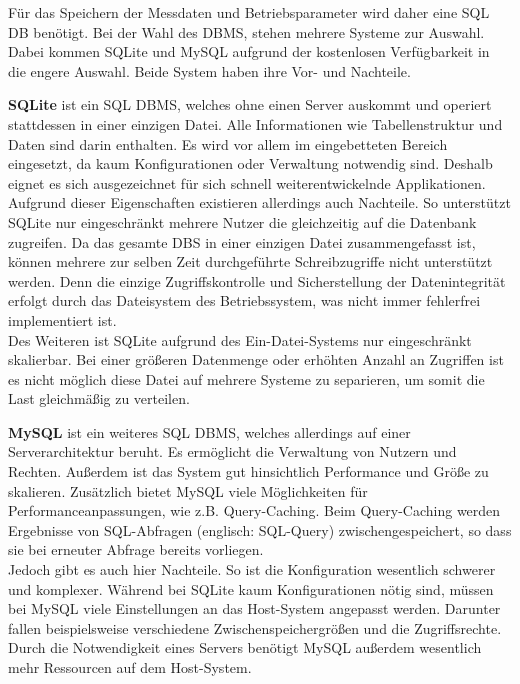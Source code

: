 Für das Speichern der Messdaten und Betriebsparameter wird daher eine \ac{SQL} \ac{DB} benötigt. Bei der Wahl des \ac{DBMS}, stehen mehrere Systeme zur Auswahl. Dabei kommen SQLite und MySQL aufgrund der kostenlosen Verfügbarkeit in die engere Auswahl.
Beide System haben ihre Vor- und Nachteile.


\textbf{SQLite} ist ein \ac{SQL} \ac{DBMS}, welches ohne einen Server auskommt und operiert stattdessen in einer einzigen Datei. Alle Informationen wie Tabellenstruktur und Daten sind darin enthalten. Es wird vor allem im eingebetteten Bereich eingesetzt, da kaum Konfigurationen oder Verwaltung notwendig sind. Deshalb eignet es sich ausgezeichnet für sich schnell weiterentwickelnde Applikationen.
\\
Aufgrund dieser Eigenschaften existieren allerdings auch Nachteile. So unterstützt SQLite nur eingeschränkt mehrere Nutzer die gleichzeitig auf die Datenbank zugreifen. Da das gesamte \ac{DBS} in einer einzigen Datei zusammengefasst ist, können mehrere zur selben Zeit durchgeführte Schreibzugriffe nicht unterstützt werden. Denn die einzige Zugriffskontrolle und Sicherstellung der Datenintegrität erfolgt durch das Dateisystem des Betriebssystem, was nicht immer fehlerfrei implementiert ist.
\\
Des Weiteren ist SQLite aufgrund des Ein-Datei-Systems nur eingeschränkt skalierbar. Bei einer größeren Datenmenge oder erhöhten Anzahl an Zugriffen ist es nicht möglich diese Datei auf mehrere Systeme zu separieren, um somit die Last gleichmäßig zu verteilen.

\textbf{MySQL} ist ein weiteres \ac{SQL} \ac{DBMS}, welches allerdings auf einer Serverarchitektur beruht. 
Es ermöglicht die Verwaltung von Nutzern und Rechten. Außerdem ist das System gut hinsichtlich Performance und Größe zu skalieren. Zusätzlich bietet MySQL viele Möglichkeiten für Performanceanpassungen, wie z.B. Query-Caching. Beim Query-Caching werden Ergebnisse von SQL-Abfragen (englisch: SQL-Query) zwischengespeichert, so dass sie bei erneuter Abfrage bereits vorliegen.
\\
Jedoch gibt es auch hier Nachteile. So ist die Konfiguration wesentlich schwerer und komplexer. Während bei SQLite kaum Konfigurationen nötig sind, müssen bei MySQL viele Einstellungen an das Host-System angepasst werden. Darunter fallen beispielsweise verschiedene Zwischenspeichergrößen und die Zugriffsrechte. Durch die Notwendigkeit eines Servers benötigt MySQL außerdem wesentlich mehr Ressourcen auf dem Host-System.

